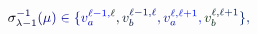 \documentclass[12pt]{article}
\begin{document}
\makeatletter
\renewcommand*{\@textcolor}[3]{%
  \protect\leavevmode
  \begingroup
    \color#1{#2}#3%
  \endgroup
}
\makeatother
\begin{displaymath}
\mathcolor[RGB]{0,0,15}{\sigma} _ { \mathcolor[RGB]{0,0,30}{\lambda} \mathcolor[RGB]{0,0,45}{-} \mathcolor[RGB]{0,0,60}{1} } ^ { \mathcolor[RGB]{0,0,75}{-} \mathcolor[RGB]{0,0,90}{1} } \mathcolor[RGB]{0,0,105}{(} \mathcolor[RGB]{0,0,120}{\mu} \mathcolor[RGB]{0,0,135}{)} \mathcolor[RGB]{0,0,150}{\in} \mathcolor[RGB]{0,0,165}{\{} \mathcolor[RGB]{0,0,180}{v} _ { \mathcolor[RGB]{0,0,195}{a} } ^ { \mathcolor[RGB]{0,0,210}{\ell} \mathcolor[RGB]{0,0,225}{-} \mathcolor[RGB]{0,0,240}{1} \mathcolor[RGB]{0,0,255}{,} \mathcolor[RGB]{0,15,0}{\ell} } \mathcolor[RGB]{0,15,15}{,} \mathcolor[RGB]{0,15,30}{v} _ { \mathcolor[RGB]{0,15,45}{b} } ^ { \mathcolor[RGB]{0,15,60}{\ell} \mathcolor[RGB]{0,15,75}{-} \mathcolor[RGB]{0,15,90}{1} \mathcolor[RGB]{0,15,105}{,} \mathcolor[RGB]{0,15,120}{\ell} } \mathcolor[RGB]{0,15,135}{,} \mathcolor[RGB]{0,15,150}{v} _ { \mathcolor[RGB]{0,15,165}{a} } ^ { \mathcolor[RGB]{0,15,180}{\ell} \mathcolor[RGB]{0,15,195}{,} \mathcolor[RGB]{0,15,210}{\ell} \mathcolor[RGB]{0,15,225}{+} \mathcolor[RGB]{0,15,240}{1} } \mathcolor[RGB]{0,15,255}{,} \mathcolor[RGB]{0,30,0}{v} _ { \mathcolor[RGB]{0,30,15}{b} } ^ { \mathcolor[RGB]{0,30,30}{\ell} \mathcolor[RGB]{0,30,45}{,} \mathcolor[RGB]{0,30,60}{\ell} \mathcolor[RGB]{0,30,75}{+} \mathcolor[RGB]{0,30,90}{1} } \mathcolor[RGB]{0,30,105}{\}} \mathcolor[RGB]{0,30,120}{,}
\end{displaymath}
\end{document}
